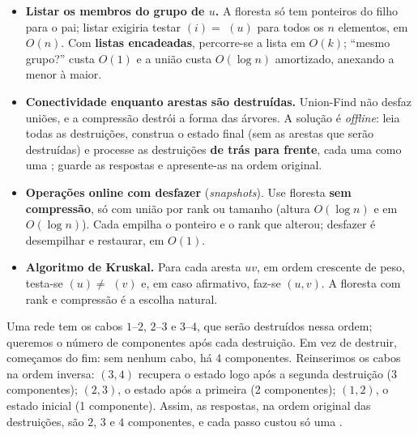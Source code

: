 \begin{roteiro}
\begin{itemize}
  \item \textbf{Listar os membros do grupo de $u$.} A floresta só tem ponteiros do filho para o pai; listar exigiria testar \Find$(i)=$ \Find$(u)$ para todos os $n$ elementos, em $O(n)$. Com \textbf{listas encadeadas}, percorre-se a lista em $O(k)$; ``mesmo grupo?'' custa $O(1)$ e a união custa $O(\log n)$ amortizado, anexando a menor à maior.
  \item \textbf{Conectividade enquanto arestas são destruídas.} Union-Find não desfaz uniões, e a compressão destrói a forma das árvores. A solução é \emph{offline}: leia todas as destruições, construa o estado final (sem as arestas que serão destruídas) e processe as destruições \textbf{de trás para frente}, cada uma como uma \Union; guarde as respostas e apresente-as na ordem original.
  \item \textbf{Operações online com desfazer} (\emph{snapshots}). Use floresta \textbf{sem compressão}, só com união por rank ou tamanho (altura $O(\log n)$ e \Find{} em $O(\log n)$). Cada \Union{} empilha o ponteiro e o rank que alterou; desfazer é desempilhar e restaurar, em $O(1)$.
  \item \textbf{Algoritmo de Kruskal.} Para cada aresta $uv$, em ordem crescente de peso, testa-se \Find$(u)\ne$ \Find$(v)$ e, em caso afirmativo, faz-se \Union$(u,v)$. A floresta com rank e compressão é a escolha natural.
\end{itemize}
\end{roteiro}

\begin{exemplo}\label{ex:ufoffline}
Uma rede tem os cabos $1$--$2$, $2$--$3$ e $3$--$4$, que serão destruídos nessa ordem; queremos o número de componentes após cada destruição. Em vez de destruir, começamos do fim: sem nenhum cabo, há 4 componentes. Reinserimos os cabos na ordem inversa: \Union$(3,4)$ recupera o estado logo após a segunda destruição (3 componentes); \Union$(2,3)$, o estado após a primeira (2 componentes); \Union$(1,2)$, o estado inicial (1 componente). Assim, as respostas, na ordem original das destruições, são $2$, $3$ e $4$ componentes, e cada passo custou só uma \Union.
\end{exemplo}

